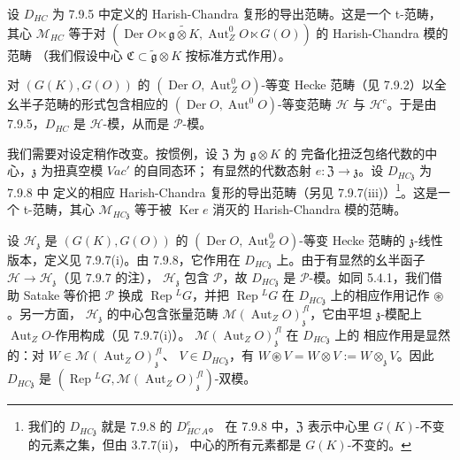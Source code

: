 设 $D_{HC}$ 为 7.9.5 中定义的 Harish-Chandra 复形的导出范畴。这是一个
t-范畴，其心 $\mathcal{M}_{HC}$ 等于对
$(\operatorname{Der}O\ltimes\widetilde{\mathfrak{g}\otimes K},
\operatorname{Aut}^{0}_{Z}O\ltimes G(O))$ 的 Harish-Chandra 模的范畴
（我们假设中心 $\mathfrak{C}\subset\tilde{\mathfrak{g}}\otimes K$ 按标准方式作用）。

对 $(G(K),G(O))$ 的 $(\operatorname{Der}O,\operatorname{Aut}^{0}_{Z}O)$-等变
Hecke 范畴（见 7.9.2）以全幺半子范畴的形式包含相应的
$(\operatorname{Der}O,\operatorname{Aut}^{0}O)$-等变范畴 $\mathcal{H}$ 与
$\mathcal{H}^{c}$。于是由 7.9.5，$D_{HC}$ 是 $\mathcal{H}$-模，从而是
$\mathcal{P}$-模。

我们需要对设定稍作改变。按惯例，设 $\mathfrak{Z}$ 为 $\mathfrak{g}\otimes K$ 的
完备化扭泛包络代数的中心，$\mathfrak{z}$ 为扭真空模 $\mathit{Vac}'$ 的自同态环；
有显然的代数态射 $e:\mathfrak{Z}\to\mathfrak{z}$。设 $D_{HC\mathfrak{z}}$ 为 7.9.8 中
定义的相应 Harish-Chandra 复形的导出范畴（另见
7.9.7(iii)）\footnote{我们的 $D_{HC\mathfrak{z}}$ 就是 7.9.8 的 $D^{e}_{HC\,A}$。
在 7.9.8 中，$\mathfrak{Z}$ 表示中心里 $G(K)$-不变的元素之集，但由 3.7.7(ii)，
中心的所有元素都是 $G(K)$-不变的。}。这是一个 t-范畴，其心
$\mathcal{M}_{HC\mathfrak{z}}$ 等于被 $\operatorname{Ker}e$ 消灭的
Harish-Chandra 模的范畴。

设 $\mathcal{H}_{\mathfrak{z}}$ 是 $(G(K),G(O))$ 的
$(\operatorname{Der}O,\operatorname{Aut}^{0}_{Z}O)$-等变 Hecke 范畴的
$\mathfrak{z}$-线性版本，定义见 7.9.7(i)。由 7.9.8，它作用在
$D_{HC\mathfrak{z}}$ 上。由于有显然的幺半函子
$\mathcal{H}\to\mathcal{H}_{\mathfrak{z}}$（见 7.9.7 的注），
$\mathcal{H}_{\mathfrak{z}}$ 包含 $\mathcal{P}$，故 $D_{HC\mathfrak{z}}$ 是
$\mathcal{P}$-模。如同 5.4.1，我们借助 Satake 等价把 $\mathcal{P}$ 换成
$\operatorname{Rep}{}^{L}G$，并把 $\operatorname{Rep}{}^{L}G$ 在
$D_{HC\mathfrak{z}}$ 上的相应作用记作 $\circledast$。另一方面，
$\mathcal{H}_{\mathfrak{z}}$ 的中心包含张量范畴
$\mathcal{M}(\operatorname{Aut}_ZO)^{fl}_{\mathfrak{z}}$，它由平坦
$\mathfrak{z}$-模配上 $\operatorname{Aut}_ZO$-作用构成（见 7.9.7(i)）。
$\mathcal{M}(\operatorname{Aut}_ZO)^{fl}_{\mathfrak{z}}$ 在 $D_{HC\mathfrak{z}}$ 上的
相应作用是显然的：对 $W\in\mathcal{M}(\operatorname{Aut}_ZO)^{fl}_{\mathfrak{z}}$、
$V\in D_{HC\mathfrak{z}}$，有
$W\circledast V=W\otimes V:=W\otimes_{\mathfrak{z}}V$。因此
$D_{HC\mathfrak{z}}$ 是
$(\operatorname{Rep}{}^{L}G,\mathcal{M}(\operatorname{Aut}_ZO)^{fl}_{\mathfrak{z}})$-双模。

